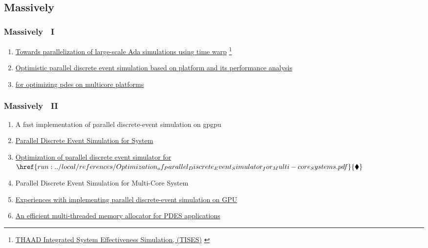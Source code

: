 \subsection{Massively  \pdes}
\begin{frame}\frametitle{Massively  \pdes\ I}
\begin{enumerate}
	\item \href{https://scholar.google.com/scholar?hl=en\&as_sdt=0\%2C32\&q=Towards+Parallelization+of+Large-scale+Ada+Simulations+Using+Time+Warp\&btnG=}{Towards parallelization of large-scale Ada simulations using time warp} {} 
	\footnote{
	\href{https://scholar.google.com/scholar?hl=en\&as_sdt=0\%2C32\&q=THAAD+Integrated+System+Effectiveness+Simulation+\%28TISES\%29\&btnG=}{THAAD Integrated System Effectiveness Simulation, (TISES)} \cite{horn1997thaad}}
	\item \href{https://scholar.google.com/scholar?hl=en\&as_sdt=0\%2C32\&q=Optimistic+Parallel+Discrete+Event+Simulation+Based+on+Multi-core+Platform+and+its+Performance+Analysis\&btnG=}{Optimistic parallel discrete event simulation based on  platform and its performance analysis} {} 
	\item \href{https://scholar.google.com/scholar?hl=en\&as_sdt=0\%2C32\&q=Multithreading+for+optimizing+PDES+on+multicore+platforms\&btnG=}{ for optimizing pdes on multicore platforms} {}
	\asuivre	
\end{enumerate}
\end{frame}

\begin{frame}\frametitle{Massively  \pdes\ II}
\begin{enumerate}
	\suite
	\item A fast implementation of parallel discrete-event simulation on gpgpu {}
	\item \href{https://ieeexplore.ieee.org/abstract/document/6574857}{Parallel Discrete Event Simulation for  System} {} 
	\item \href{https://scholar.google.com/scholar?hl=en\&as_sdt=0\%2C32\&q=Optimization+of+parallel+discrete+event+simulator+for+multi-core+systems\&btnG=}{Optimization of parallel discrete event simulator for } {}
	$\href{run:../local/references/Optimization_of_Parallel_Discrete_Event_Simulator_for_Multi-core_Systems.pdf}{\blacklozenge}$
	\item Parallel Discrete Event Simulation for Multi-Core System {}
	\item \href{https://engagedscholarship.csuohio.edu/cgi/viewcontent.cgi?article=1467\&context=enece_facpub}{Experiences with implementing parallel discrete-event simulation on GPU} {}
	\item \href{An efficient multi-threaded memory allocator for PDES applications}{An efficient multi-threaded memory allocator for PDES applications} {}
\end{enumerate}
\end{frame}


\endinput  %

